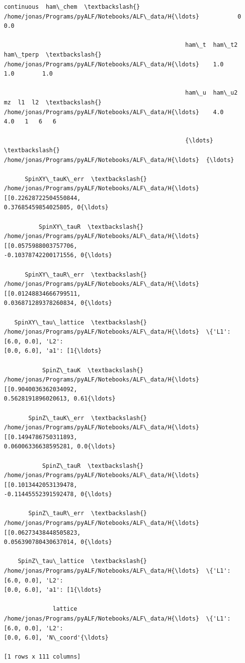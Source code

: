             \begin{tcolorbox}[breakable, size=fbox, boxrule=.5pt, pad at break*=1mm, opacityfill=0]
\begin{Verbatim}[commandchars=\\\{\}]
                                                    continuous  ham\_chem  \textbackslash{}
/home/jonas/Programs/pyALF/Notebooks/ALF\_data/H{\ldots}           0       0.0

                                                    ham\_t  ham\_t2  ham\_tperp  \textbackslash{}
/home/jonas/Programs/pyALF/Notebooks/ALF\_data/H{\ldots}    1.0     1.0        1.0

                                                    ham\_u  ham\_u2  mz  l1  l2  \textbackslash{}
/home/jonas/Programs/pyALF/Notebooks/ALF\_data/H{\ldots}    4.0     4.0   1   6   6

                                                    {\ldots}  \textbackslash{}
/home/jonas/Programs/pyALF/Notebooks/ALF\_data/H{\ldots}  {\ldots}

      SpinXY\_tauK\_err  \textbackslash{}
/home/jonas/Programs/pyALF/Notebooks/ALF\_data/H{\ldots}  [[0.22628722504550844,
0.37685459854025805, 0{\ldots}

          SpinXY\_tauR  \textbackslash{}
/home/jonas/Programs/pyALF/Notebooks/ALF\_data/H{\ldots}  [[0.0575988003757706,
-0.10378742200171556, 0{\ldots}

      SpinXY\_tauR\_err  \textbackslash{}
/home/jonas/Programs/pyALF/Notebooks/ALF\_data/H{\ldots}  [[0.01248834666799511,
0.036871289378260834, 0{\ldots}

   SpinXY\_tau\_lattice  \textbackslash{}
/home/jonas/Programs/pyALF/Notebooks/ALF\_data/H{\ldots}  \{'L1': [6.0, 0.0], 'L2':
[0.0, 6.0], 'a1': [1{\ldots}

           SpinZ\_tauK  \textbackslash{}
/home/jonas/Programs/pyALF/Notebooks/ALF\_data/H{\ldots}  [[0.9040036362034092,
0.5628191896020613, 0.61{\ldots}

       SpinZ\_tauK\_err  \textbackslash{}
/home/jonas/Programs/pyALF/Notebooks/ALF\_data/H{\ldots}  [[0.1494786750311893,
0.06006336638595281, 0.0{\ldots}

           SpinZ\_tauR  \textbackslash{}
/home/jonas/Programs/pyALF/Notebooks/ALF\_data/H{\ldots}  [[0.1013442053139478,
-0.11445552391592478, 0{\ldots}

       SpinZ\_tauR\_err  \textbackslash{}
/home/jonas/Programs/pyALF/Notebooks/ALF\_data/H{\ldots}  [[0.06273438448505823,
0.056390780430637014, 0{\ldots}

    SpinZ\_tau\_lattice  \textbackslash{}
/home/jonas/Programs/pyALF/Notebooks/ALF\_data/H{\ldots}  \{'L1': [6.0, 0.0], 'L2':
[0.0, 6.0], 'a1': [1{\ldots}

              lattice
/home/jonas/Programs/pyALF/Notebooks/ALF\_data/H{\ldots}  \{'L1': [6.0, 0.0], 'L2':
[0.0, 6.0], 'N\_coord'{\ldots}

[1 rows x 111 columns]
\end{Verbatim}
\end{tcolorbox}
        
